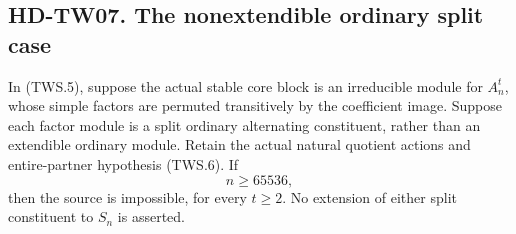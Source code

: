 \subsection*{HD-TW07. The nonextendible ordinary split case}

\begin{theorem}[HD-TW07]
In (TWS.5), suppose the actual stable core block is an irreducible
module for \(A_n^t\), whose simple factors are permuted transitively
by the coefficient image. Suppose each factor module is a split
ordinary alternating constituent, rather than an extendible
ordinary module. Retain the actual natural quotient actions and
entire-partner hypothesis (TWS.6). If
\[
                              n\ge65536,
                              \tag{TWS.12}
\]
then the source is impossible, for every \(t\ge2\).
No extension of either split constituent to \(S_n\) is asserted.
\end{theorem}

